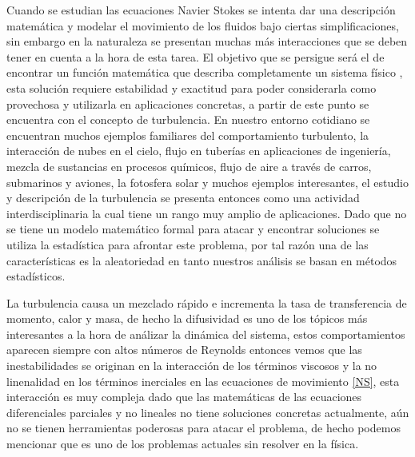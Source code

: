 Cuando se estudian las ecuaciones  Navier Stokes se intenta dar una descripción matemática y modelar el movimiento de los fluidos bajo ciertas simplificaciones, sin embargo en la naturaleza se presentan muchas más interacciones que se deben tener en cuenta a la hora de esta tarea. El objetivo que se persigue será el de encontrar un función matemática que describa completamente un sistema físico , esta solución requiere estabilidad y exactitud para poder considerarla como provechosa y utilizarla en aplicaciones concretas, a partir de este punto se encuentra con el concepto de turbulencia. En nuestro entorno cotidiano se encuentran muchos ejemplos familiares del comportamiento turbulento, la interacción de nubes en el cielo, flujo en tuberías en aplicaciones de ingeniería, mezcla de sustancias en procesos químicos, flujo de aire a través de carros, submarinos y aviones, la fotosfera solar y muchos ejemplos interesantes, el estudio y descripción de la turbulencia se presenta entonces como una actividad interdisciplinaria la cual tiene un rango muy amplio de aplicaciones.  Dado que no se tiene un modelo matemático formal para atacar y encontrar soluciones se utiliza la estadística para afrontar este problema, por tal razón una de las características es la aleatoriedad en tanto nuestros análisis se basan en métodos estadísticos. 

La turbulencia causa un mezclado rápido e incrementa la tasa de transferencia de momento, calor  y masa, de hecho la difusividad es uno de los tópicos más interesantes a la hora de análizar la dinámica del sistema, estos comportamientos aparecen siempre con altos números de Reynolds entonces vemos que las inestabilidades se originan en la interacción de los términos viscosos y la no linenalidad en los términos inerciales en las ecuaciones de movimiento \eqref{NS}, esta interacción es muy compleja dado que las matemáticas de las ecuaciones diferenciales parciales y no lineales no tiene soluciones concretas actualmente, aún no se tienen herramientas poderosas para atacar el problema, de hecho podemos mencionar que es uno de los problemas actuales sin resolver en la física.





